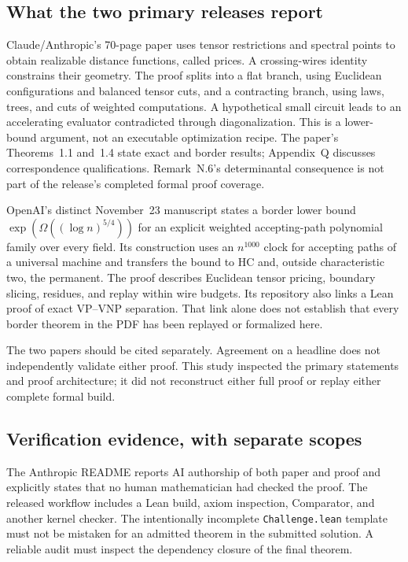 \documentclass[11pt,letterpaper]{article}
\begin{document}
\subsection{What the two primary releases report}
Claude/Anthropic's 70-page paper uses tensor restrictions and spectral points to obtain realizable distance functions, called prices. A crossing-wires identity constrains their geometry. The proof splits into a flat branch, using Euclidean configurations and balanced tensor cuts, and a contracting branch, using laws, trees, and cuts of weighted computations. A hypothetical small circuit leads to an accelerating evaluator contradicted through diagonalization. This is a lower-bound argument, not an executable optimization recipe. The paper's Theorems~1.1 and~1.4 state exact and border results; Appendix~Q discusses correspondence qualifications. Remark~N.6's determinantal consequence is not part of the release's completed formal proof coverage.\cite{anthropic}

OpenAI's distinct November~23 manuscript states a border lower bound $\exp(\Omega((\log n)^{5/4}))$ for an explicit weighted accepting-path polynomial family over every field. Its construction uses an $n^{1000}$ clock for accepting paths of a universal machine and transfers the bound to HC and, outside characteristic two, the permanent. The proof describes Euclidean tensor pricing, boundary slicing, residues, and replay within wire budgets. Its repository also links a Lean proof of exact VP--VNP separation. That link alone does not establish that every border theorem in the PDF has been replayed or formalized here.\cite{openai}

The two papers should be cited separately. Agreement on a headline does not independently validate either proof. This study inspected the primary statements and proof architecture; it did not reconstruct either full proof or replay either complete formal build.

\subsection{Verification evidence, with separate scopes}
The Anthropic README reports AI authorship of both paper and proof and explicitly states that no human mathematician had checked the proof. The released workflow includes a Lean build, axiom inspection, Comparator, and another kernel checker. The intentionally incomplete \texttt{Challenge.lean} template must not be mistaken for an admitted theorem in the submitted solution. A reliable audit must inspect the dependency closure of the final theorem.\cite{anthropicrepo}
\end{document}
